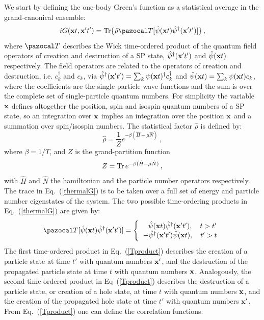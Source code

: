We start by defining the one-body Green's function as a statistical average in the grand-canonical ensemble:
\begin{equation}
\label{thermalG}
iG({\bf x}t, {\bf x'}t')= {\rm Tr}\{\hat{\rho}{\pazocal T}[\hat\psi({\bf x}t) \hat\psi^\dagger({\bf x'}t')]\}\,,
\end{equation}
where ${\pazocal T}$ describes the Wick time-ordered product of the quantum field operators of creation and destruction of a SP state, $\hat\psi^\dagger({\bf x'}t')$ and $\hat\psi({\bf x}t)$ respectively. The field operators are related to the operators of creation and destruction, i.e. $c^\dagger_k$ and $c_k$, via $\hat\psi^\dagger({\bf x'}t')=\sum_k\psi({\bf x}t)^\dagger c^\dagger_k$ and $\hat\psi({\bf x}t)=\sum_k\psi({\bf x}t)c_k$, where the coefficients are the single-particle wave functions and the sum is over the complete set of single-particle quantum numbers. For simplicity the variable ${\bf x}$ defines altogether the position, spin and isospin quantum numbers of a SP state, so an integration over ${\bf x}$ implies an integration over the position ${\bf x}$ and a summation over spin/isospin numbers. The statistical factor $\hat \rho$ is defined by:
\begin{equation}
\hat \rho=\frac{1}{Z}e^{-\beta(\hat H -\mu\hat N)}\,,
\end{equation}
where $\beta=1/T$, and $Z$ is the grand-partition function
\begin{equation}
Z={\rm Tr}\,e^{-\beta(\hat H -\mu\hat N)}\,,
\end{equation}
with $\hat H$ and $\hat N$ the hamiltonian and the particle number operators respectively. The trace in Eq.~(\ref{thermalG}) is to be taken over a full set of energy and particle number eigenstates of the system. The two possible time-ordering products in Eq.~(\ref{thermalG}) are given by:
\begin{equation}
\label{Tproduct}
{\pazocal T}[\hat\psi({\bf x}t) \hat\psi^\dagger({\bf x'}t')]=
 \Bigg\{
  \begin{tabular}{c}
  \,\,\,\,$\hat\psi({\bf x}t) \hat\psi^\dagger({\bf x'}t'), \quad t>t'$  \\
  $-\hat\psi^\dagger({\bf x'}t') \hat\psi({\bf x}t), \quad t'>t$
  \end{tabular}
\end{equation}
The first time-ordered product in Eq.~(\ref{Tproduct}) describes the creation of a particle state at time $t'$ with quantum numbers ${\bf x'}$, and the destruction of the propagated particle state at time $t$ with quantum numbers ${\bf x}$. Analogously, the second time-ordered product in Eq~(\ref{Tproduct}) describes the destruction of a particle state, or creation of a hole state, at time $t$ with quantum numbers ${\bf x}$, and the creation of the propagated hole state at time $t'$ with quantum numbers ${\bf x'}$. From Eq.~(\ref{Tproduct}) one can define the correlation functions: 
